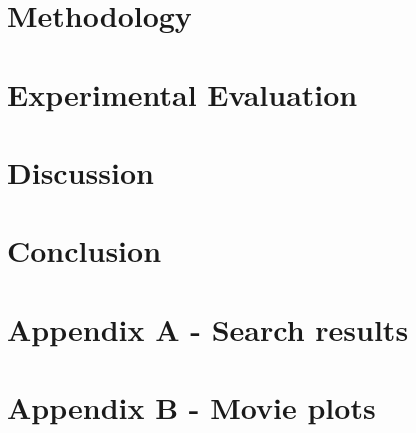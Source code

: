 \documentclass[sigconf]{acmart}
\begin{document}
	
	\section{Methodology}
	\label{sec:method}
	
	
	
	\section{Experimental Evaluation}
	\label{sec:evaluation}
	
    
    \section{Discussion}
    \label{sec:discussion}
    
    
	
	\section{Conclusion}
	\label {sec:conclusion}
	
	
	
	
	
	
	
	
	


    \newpage
    \section{Appendix A - Search results}
    \label{sec:appendixA}
    

    \newpage
    \section{Appendix B - Movie plots}
    \label{sec:appendixB}
    
\end{document}

